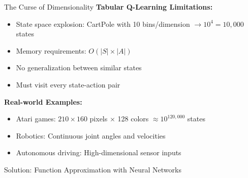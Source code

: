 \documentclass[aspectratio=169,10pt]{beamer}
\begin{document}
\begin{frame}{The Curse of Dimensionality}
\textbf{Tabular Q-Learning Limitations:}
\begin{itemize}
    \item State space explosion: CartPole with 10 bins/dimension $\rightarrow 10^4 = 10,000$ states
    \item Memory requirements: $O(|S| \times |A|)$
    \item No generalization between similar states
    \item Must visit every state-action pair
\end{itemize}

\vspace{0.3cm}
\textbf{Real-world Examples:}
\begin{itemize}
    \item Atari games: $210 \times 160$ pixels $\times$ 128 colors $\approx 10^{120,000}$ states
    \item Robotics: Continuous joint angles and velocities
    \item Autonomous driving: High-dimensional sensor inputs
\end{itemize}

\vspace{0.3cm}
\alert{Solution: Function Approximation with Neural Networks}

\end{frame}
\end{document}
